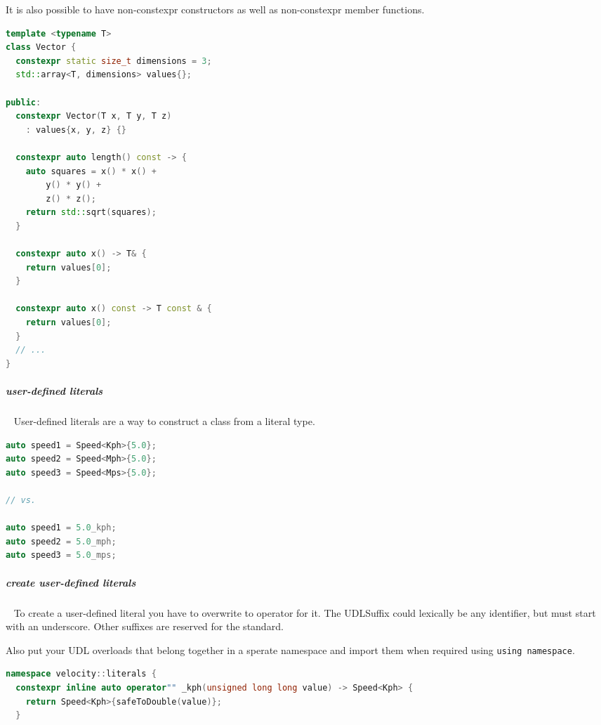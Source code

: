 \documentclass[11pt,twoside,landscape]{article}
\begin{document}
\begin{multicols}{2}
It is also possible to have non-constexpr constructors as well as non-constexpr member functions.

\begin{lstlisting}[language=c++,label=lst:example-for-a-literal-class-type,caption={Example for a literal class type},captionpos=b,numbers=none]
template <typename T>
class Vector {
  constexpr static size_t dimensions = 3;
  std::array<T, dimensions> values{};

public:
  constexpr Vector(T x, T y, T z)
    : values{x, y, z} {}

  constexpr auto length() const -> {
    auto squares = x() * x() +
        y() * y() +
        z() * z();
    return std::sqrt(squares);
  }

  constexpr auto x() -> T& {
    return values[0];
  }

  constexpr auto x() const -> T const & {
    return values[0];
  }
  // ...
}
\end{lstlisting}

\subparagraph{user-defined literals} \
\label{sec:orgf808342}
User-defined literals are a way to construct a class from a literal type.

\begin{lstlisting}[language=c++,label=lst:user-defined-literals-in-action,caption={User-defined literals in action},captionpos=b,numbers=none]
auto speed1 = Speed<Kph>{5.0};
auto speed2 = Speed<Mph>{5.0};
auto speed3 = Speed<Mps>{5.0};

// vs.

auto speed1 = 5.0_kph;
auto speed2 = 5.0_mph;
auto speed3 = 5.0_mps;
\end{lstlisting}

\subparagraph{create user-defined literals} \
\label{sec:org40b14ff}
To create a user-defined literal you have to overwrite to operator for it.
The UDLSuffix could lexically be any identifier, but must start with an underscore.
Other suffixes are reserved for the standard.

Also put your UDL overloads that belong together in a sperate namespace and import them when required using \texttt{using namespace}.

\begin{lstlisting}[language=c++,label=lst:user-defined-literal-for-speed,caption={user-defined literal for Speed},captionpos=b,numbers=none]
namespace velocity::literals {
  constexpr inline auto operator"" _kph(unsigned long long value) -> Speed<Kph> {
    return Speed<Kph>{safeToDouble(value)};
  }


\end{lstlisting}
\end{multicols}
\end{document}
